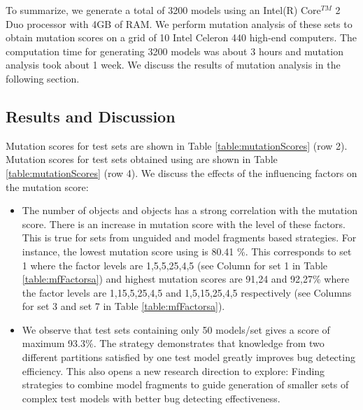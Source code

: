 To summarize, we generate a total of 3200  models using an Intel(R) Core$^{TM}$ 2 Duo processor with  4GB of RAM. We perform mutation analysis of these sets to obtain mutation scores on a grid of 10 Intel Celeron 440 high-end computers. The computation time for generating 3200 models was about 3 hours and mutation analysis took  about 1 week. We discuss the results of mutation analysis in the following section. 

\subsection{Results and Discussion}
\label{sec:results}


Mutation scores for {\AllRanges} test sets are shown in Table \ref{table:mutationScores} (row 2). Mutation scores for test sets obtained using {\AllPartitions} are shown in Table \ref{table:mutationScores} (row 4). We discuss the effects of the influencing factors on the mutation score:
\begin{itemize}
	\item The number of {\Class} objects and {\Association} objects has a strong correlation with the mutation score. There is an increase in mutation score with the level of these factors. This is true for sets from unguided and model fragments based strategies. For instance, the lowest mutation score using {\AllRanges} is 80.41 \%. This corresponds to set 1 where the factor levels are 1,5,5,25,4,5  (see Column for set 1 in Table \ref{table:mfFactorsa}) and highest mutation scores are 91,24 and 92,27\% where the factor levels are 1,15,5,25,4,5 and 1,5,15,25,4,5 respectively  (see Columns for set 3 and set 7 in Table \ref{table:mfFactorsa}).

	\item We observe that {\AllPartitions} test sets containing only 50 models/set gives a score of maximum 93.3\%. The {\AllPartitions} strategy demonstrates that knowledge from two different partitions satisfied by one test model greatly improves bug detecting efficiency. This also opens a new research direction to explore: Finding strategies to combine model fragments to guide generation of  smaller sets of complex test models with better bug detecting effectiveness.
\end{itemize}


